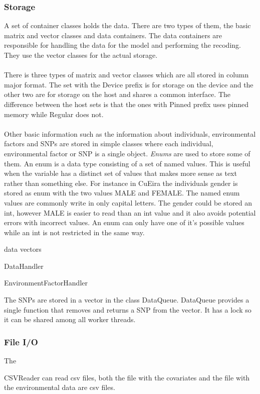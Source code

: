 \documentclass[10pt,a4paper]{report}
\begin{document}
\subsubsection{Storage}
A set of container classes holds the data. There are two types of them, the basic matrix and vector classes and data containers. The data containers are responsible for handling the data for the model and performing the recoding. They use the vector classes for the actual storage.\\
\\
There is three types of matrix and vector classes which are all stored in column major format. The set with the Device prefix is for storage on the device and the other two are for storage on the host and shares a common interface. The difference between the host sets is that the ones with Pinned prefix uses pinned memory while Regular does not.\\
\\
Other basic information such as the information about individuals, environmental factors and SNPs are stored in simple classes where each individual, environmental factor or SNP is a single object. \emph{Enums} are used to store some of them. An enum is a data type consisting of a set of named values. This is useful when the variable has a distinct set of values that makes more sense as text rather than something else. For instance in CuEira the individuals gender is stored as enum with the two values MALE and FEMALE. The named enum values are commonly write in only capital letters. The gender could be stored an int, however MALE is easier to read than an int value and it also avoids potential errors with incorrect values. An enum can only have one of it's possible values while an int is not restricted in the same way. 

data vectors

DataHandler %

EnvironmentFactorHandler

The SNPs are stored in a vector in the class DataQueue. DataQueue provides a single function that removes and returns a SNP from the vector. It has a lock so it can be shared among all worker threads. 

\subsubsection{File I/O}
The 

CSVReader can read csv files, both the file with the covariates and the file with the environmental data are csv files.
\end{document}

